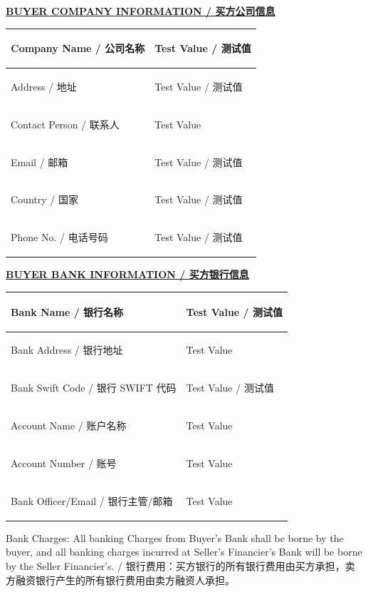\documentclass[a4paper,11pt]{article}
\begin{document}
\vspace{0.6cm}

\begin{center}{\large\textbf{\underline{\color{marooncolor}BUYER COMPANY INFORMATION / 买方公司信息}}}\end{center}
\vspace{0.1cm}
\begin{center}
\begin{tabularx}{\textwidth}{|>{\bfseries\raggedright\arraybackslash}p{5cm}|>{\raggedright\arraybackslash}X|}
\hline
Company Name / 公司名称 & Test Value / 测试值 \\ \hline
Address / 地址 & Test Value / 测试值 \\ \hline
Contact Person / 联系人 & Test Value \\ \hline
Email / 邮箱 & Test Value / 测试值 \\ \hline
Country / 国家 & Test Value / 测试值 \\ \hline
Phone No. / 电话号码 & Test Value / 测试值 \\ \hline
\end{tabularx}
\end{center}

\newpage

\begin{center}{\large\textbf{\underline{\color{marooncolor}BUYER BANK INFORMATION / 买方银行信息}}}\end{center}
\vspace{0.2cm}
\begin{center}
\begin{tabularx}{\textwidth}{|>{\bfseries\raggedright\arraybackslash}p{5cm}|>{\raggedright\arraybackslash}X|}
\hline
Bank Name / 银行名称 & Test Value / 测试值 \\ \hline
Bank Address / 银行地址 & Test Value \\ \hline
Bank Swift Code / 银行 SWIFT 代码 & Test Value / 测试值 \\ \hline
Account Name / 账户名称 & Test Value \\ \hline
Account Number / 账号 & Test Value \\ \hline
Bank Officer/Email / 银行主管/邮箱 & Test Value \\ \hline
\end{tabularx}
\end{center}

\vspace{0.5cm}

\noindent Bank Charges: All banking Charges from Buyer's Bank shall be borne by the buyer, and all banking charges incurred at Seller's Financier's Bank will be borne by the Seller Financier's. / 银行费用：买方银行的所有银行费用由买方承担，卖方融资银行产生的所有银行费用由卖方融资人承担。
\end{document}
